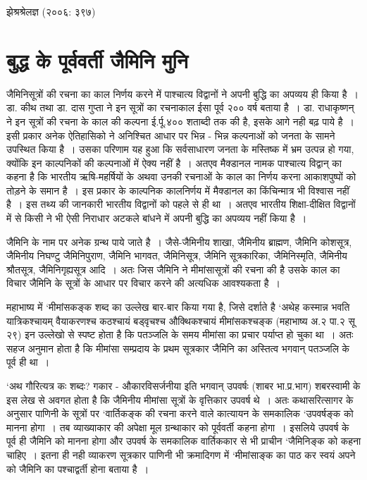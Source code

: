 {    झेश्रश्रेलज्ञ (२००६: ३९७)


\section*{बुद्ध के पूर्ववर्ती जैमिनि मुनि}

जैमिनिसूत्रों की रचना का काल निर्णय करने में पाश्चात्य विद्वानों ने अपनी बुद्धि का अपव्यय ही किया है~। डा. कीथ तथा डा. दास गुप्ता  ने इन सूत्रों का रचनाकाल ईसा पूर्व २०० वर्ष बताया है~। डा. राधाकृष्णन् ने इन सूत्रों की रचना के काल की कल्पना ई.र्पू.४०० शताब्दी तक की है, इसके आगे नही बढ़ पाये है~। इसी प्रकार अनेक ऐतिहासिको ने अनिश्चित आधार पर भिन्न - भिन्न कल्पनाओं को जनता के सामने उपस्थित किया है~। उसका परिणाम यह हुआ कि सर्वसाधारण जनता के मस्तिष्क में भ्रम उत्पन्न हो गया, क्योंकि इन काल्पनिकों की कल्पनाओं में ऐक्य नहीं है~। अतएव मैक्डानल नामक पाश्चात्य विद्वान् का कहना है कि भारतीय ऋषि-महर्षियों के अथवा उनकी रचनाओं के काल का निर्णय करना आकाशपुष्पों को तोड़ने के समान है~। इस प्रकार के काल्पनिक कालनिर्णय में मैक्डानल का किंचिन्मात्र भी विश्वास नहीं है~। इस तथ्य की जानकारी भारतीय विद्वानों को पहले से ही था~। अतएव भारतीय शिक्षा-दीक्षित विद्वानों में से किसी ने भी ऐसी निराधार अटकले बांधने में अपनी बुद्धि का अपव्यय नहीं किया है~। 

जैमिनि के नाम पर अनेक ग्रन्थ पाये जाते है~। जैसे-जैमिनीय शाखा, जैमिनीय ब्राह्मण, जैमिनि कोशसूत्र, जैमिनीय निघण्टु  जैमिनिपुराण, जैमिनि भागवत, जैमिनिसूत्र, जैमिनि सूत्रकारिका, जैमिनिस्मृति, जैमिनीय श्रौतसूत्र, जैमिनिगृह्यसूत्र आदि~। अतः जिस जैमिनि ने मीमांसासूत्रों की रचना की है उसके काल का विचार जैमिनि के सूत्रों के आधार पर विचार करने की अत्यधिक आवश्यकता है~।  

महाभाष्य में ‘मीमांसकङ्क शब्द का उल्लेख बार-बार किया गया है, जिसे दर्शाते है ‘अथेह कस्मान्न भवति यात्रिकश्चायम् वैयाकरणश्च कठश्चायं बड्वृचश्च औक्थिकश्चायं मीमांसकश्चङ्क (महाभाष्य अ.२ पा.२ सू २९) इन उल्लेखो से स्पष्ट होता है कि पतञ्जलि के समय मीमांसा का प्रचार पर्याप्त हो चुका था~। अतः सहज अनुमान होता है कि मीमांसा सम्प्रदाय के प्रथम सूत्रकार जैमिनि का अस्तित्व भगवान् पतञ्जलि के पूर्व ही था~। 

‘अथ गौरित्यत्र कः शब्दः? गकार - औकारविसर्जनीया इति भगवान् उपवर्षः (शाबर भा.प्र.भाग) शबरस्वामी के इस लेख से अवगत होता है कि जैमिनीय मीमांसा सूत्रों के वृत्तिकार उपवर्ष थे~। अतः कथासरित्सागर के अनुसार पाणिनी के सूत्रों पर ‘वार्तिकङ्क की रचना करने वाले कात्यायन के समकालिक ‘उपवर्षङ्क को मानना होगा~। तब व्याख्याकार की अपेक्षा मूल ग्रन्थाकार को पूर्ववर्ती कहना होगा~। इसलिये उपवर्ष के पूर्व ही जैमिनि को मानना होगा और उपवर्ष के समकालिक वार्तिककार से भी प्राचीन ‘जैमिनिङ्क को कहना चाहिए~। इतना ही नही व्याकरण सूत्रकार पाणिनी भी क्रमादिगण में ‘मीमांसाङ्क का पाठ कर स्वयं अपने को जैमिनि का पश्चाद्वर्ती होना बताया है~। 

}
